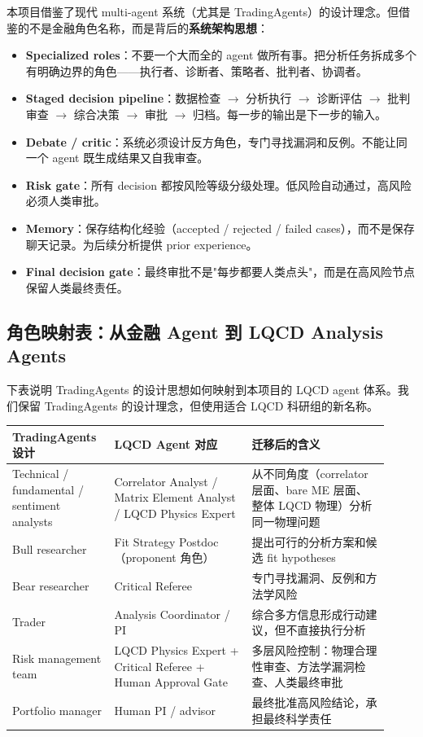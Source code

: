 \documentclass[11pt,a4paper,fontset=fandol]{ctexart}
\begin{document}
本项目借鉴了现代 multi-agent 系统（尤其是 TradingAgents）的设计理念。但借鉴的不是金融角色名称，而是背后的\textbf{系统架构思想}：

\begin{itemize}
  \item \textbf{Specialized roles}：不要一个大而全的 agent 做所有事。把分析任务拆成多个有明确边界的角色——执行者、诊断者、策略者、批判者、协调者。
  \item \textbf{Staged decision pipeline}：数据检查 $\to$ 分析执行 $\to$ 诊断评估 $\to$ 批判审查 $\to$ 综合决策 $\to$ 审批 $\to$ 归档。每一步的输出是下一步的输入。
  \item \textbf{Debate / critic}：系统必须设计反方角色，专门寻找漏洞和反例。不能让同一个 agent 既生成结果又自我审查。
  \item \textbf{Risk gate}：所有 decision 都按风险等级分级处理。低风险自动通过，高风险必须人类审批。
  \item \textbf{Memory}：保存结构化经验（accepted / rejected / failed cases），而不是保存聊天记录。为后续分析提供 prior experience。
  \item \textbf{Final decision gate}：最终审批不是"每步都要人类点头"，而是在高风险节点保留人类最终责任。
\end{itemize}

\subsection{角色映射表：从金融 Agent 到 LQCD Analysis Agents}

下表说明 TradingAgents 的设计思想如何映射到本项目的 LQCD agent 体系。我们保留 TradingAgents 的设计理念，但使用适合 LQCD 科研组的新名称。

\begin{center}
\begin{longtable}{p{0.24\linewidth}p{0.34\linewidth}p{0.34\linewidth}}
\toprule
TradingAgents 设计 & LQCD Agent 对应 & 迁移后的含义 \\
\midrule
Technical / fundamental / sentiment analysts & Correlator Analyst / Matrix Element Analyst / LQCD Physics Expert & 从不同角度（correlator 层面、bare ME 层面、整体 LQCD 物理）分析同一物理问题 \\
Bull researcher & Fit Strategy Postdoc（proponent 角色） & 提出可行的分析方案和候选 fit hypotheses \\
Bear researcher & Critical Referee & 专门寻找漏洞、反例和方法学风险 \\
Trader & Analysis Coordinator / PI & 综合多方信息形成行动建议，但不直接执行分析 \\
Risk management team & LQCD Physics Expert + Critical Referee + Human Approval Gate & 多层风险控制：物理合理性审查、方法学漏洞检查、人类最终审批 \\
Portfolio manager & Human PI / advisor & 最终批准高风险结论，承担最终科学责任 \\
\bottomrule
\end{longtable}
\end{center}
\end{document}
